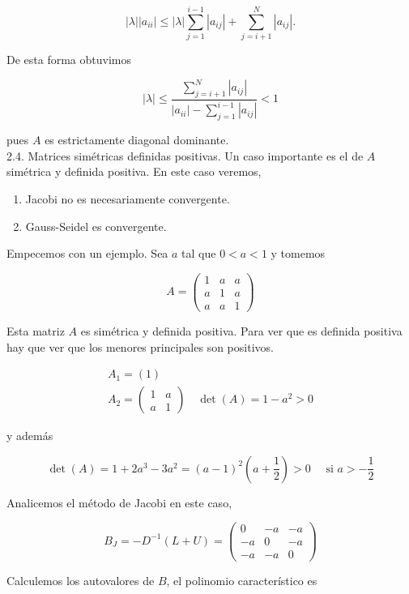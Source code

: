 \documentclass[10pt]{book}
\begin{document}
$$
|\lambda|\left|a_{i i}\right| \leq|\lambda| \sum_{j=1}^{i-1}\left|a_{i j}\right|+\sum_{j=i+1}^{N}\left|a_{i j}\right| .
$$

De esta forma obtuvimos

$$
|\lambda| \leq \frac{\sum_{j=i+1}^{N}\left|a_{i j}\right|}{\left|a_{i i}\right|-\sum_{j=1}^{i-1}\left|a_{i j}\right|}<1
$$

pues $A$ es estrictamente diagonal dominante.\\
2.4. Matrices simétricas definidas positivas. Un caso importante es el de $A$ simétrica y definida positiva. En este caso veremos,

\begin{enumerate}
  \item Jacobi no es necesariamente convergente.
  \item Gauss-Seidel es convergente.
\end{enumerate}

Empecemos con un ejemplo. Sea $a$ tal que $0<a<1$ y tomemos

$$
A=\left(\begin{array}{lll}
1 & a & a \\
a & 1 & a \\
a & a & 1
\end{array}\right)
$$

Esta matriz $A$ es simétrica y definida positiva. Para ver que es definida positiva hay que ver que los menores principales son positivos.

$$
\begin{gathered}
A_{1}=(1) \\
A_{2}=\left(\begin{array}{cc}
1 & a \\
a & 1
\end{array}\right) \quad \operatorname{det}(A)=1-a^{2}>0
\end{gathered}
$$

y además

$$
\operatorname{det}(A)=1+2 a^{3}-3 a^{2}=(a-1)^{2}\left(a+\frac{1}{2}\right)>0 \quad \text { si } a>-\frac{1}{2}
$$

Analicemos el método de Jacobi en este caso,

$$
B_{J}=-D^{-1}(L+U)=\left(\begin{array}{ccc}
0 & -a & -a \\
-a & 0 & -a \\
-a & -a & 0
\end{array}\right)
$$

Calculemos los autovalores de $B$, el polinomio característico es
\end{document}

